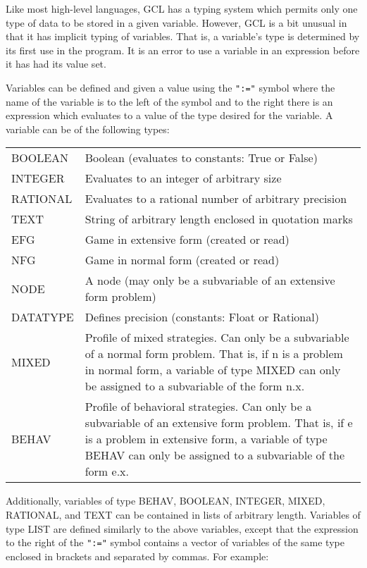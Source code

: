 Like most high-level languages, GCL has a typing system which permits
only one type of data to be stored in a given variable.  However, GCL
is a bit unusual in that it has implicit typing of variables.  That
is, a variable's type is determined by its first use in the program.
It is an error to use a variable in an expression before it has had
its value set.

Variables can be defined and given a value using the {\tt ":="} symbol
where the name of the variable is to the left of the symbol and to the
right there is an expression which evaluates to a value of the type
desired for the variable. A variable can be of the following types:

\medskip

\begin{tabular}{lp{4in}}
BOOLEAN & Boolean (evaluates to constants: True or False)\\ 
INTEGER & Evaluates to an integer of arbitrary size \\ 
RATIONAL & Evaluates to a rational number of arbitrary precision\\ 
TEXT	& String of arbitrary length enclosed in quotation marks\\ 
EFG	& Game in extensive form (created or read)\\ 
NFG	& Game in normal form (created or read)\\ 
NODE	& A node (may only be a subvariable of an extensive
form problem) \\ 
DATATYPE & Defines precision (constants: Float or
Rational) \\ 
MIXED	& {Profile of mixed strategies.  Can only be a
subvariable of a normal form problem.  That is, if n is a problem in
normal form, a variable of type MIXED can only be assigned to a
subvariable of the form n.x.}\\ 
BEHAV	& Profile of behavioral
strategies.  Can only be a subvariable of an extensive form problem.
That is, if e is a problem in extensive form, a variable of type BEHAV
can only be assigned to a subvariable of the form e.x. \\
\end{tabular}

\medskip

\noindent
Additionally, variables of type BEHAV, BOOLEAN, INTEGER, MIXED,
RATIONAL, and TEXT can be contained in lists of arbitrary length.
Variables of type LIST are defined similarly to the above variables,
except that the expression to the right of the {\tt ":="} symbol
contains a vector of variables of the same type enclosed in brackets
and separated by commas.  For example:

